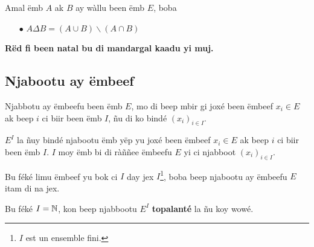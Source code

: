 \documentclass[twoside, a4paper]{article}
\begin{document}
\begin{tcolorbox}[enhanced jigsaw,breakable,pad at break*=1mm, colback=orange!5!white,colframe=white!75!black,title= Seetlu,
    watermark color=white]
  Amal ëmb $A$ ak $B$ ay wàllu been ëmb $E$, boba
  \begin{itemize}
    \item[$\bullet$] $A \Delta  B = (A \cup B) \backslash (A \cap B)$
  \end{itemize}
\end{tcolorbox}
\textbf{Rëd fi been natal bu di mandargal kaadu yi muj.}


\subsection{Njabootu ay ëmbeef}
\begin{tcolorbox}[enhanced jigsaw,breakable,pad at break*=1mm, colback=red!5!white,colframe=white!75!black,title= Téeki,watermark color=white]
  Njabbotu ay ëmbeefu been ëmb $E$, mo di beep mbir gi joxé been ëmbeef $x_i \in E$ ak beep $i$ ci biir been ëmb $I$, ñu di ko bindé $(x_i)_{i\in I}$.

  $E^I$ la ñuy bindé njabootu ëmb yëp yu joxé been ëmbeef $x_i \in E$ ak beep $i$ ci biir been ëmb $I$. $I$ moy ëmb bi di ràññee ëmbeefu $E$ yi ci njabboot $(x_i)_{i\in I}$.
\end{tcolorbox}
\begin{tcolorbox}[enhanced jigsaw,breakable,pad at break*=1mm, colback=orange!5!white,colframe=white!75!black,title= Seetlu,
    watermark color=white]
  Bu féké limu ëmbeef yu bok ci $I$ day jex $I$\footnote{$I$ est un ensemble fini.}, boba beep njabootu ay ëmbeefu $E$ itam di na jex.

  Bu féké $I=\mathbb{N}$, kon beep njabbootu $E^I$ \textbf{topalanté} la ñu koy wowé.
\end{tcolorbox}
\end{document}

